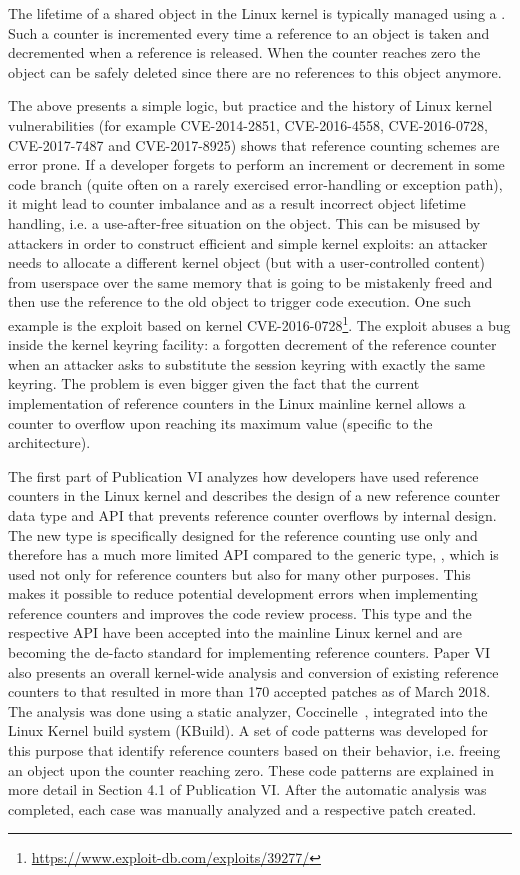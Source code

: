 The lifetime of a shared object in the Linux kernel is typically managed using a . 
Such a counter is incremented every time a reference to an object is taken and decremented when a reference is released. 
When the counter reaches zero the object can be safely deleted since there are no references to this object anymore.

The above presents a simple logic, but practice and the history of Linux kernel vulnerabilities (for example CVE-2014-2851, CVE-2016-4558, CVE-2016-0728, CVE-2017-7487 and CVE-2017-8925) shows that reference counting schemes are error prone. If a developer forgets to perform an increment or decrement in some code branch (quite often on a rarely exercised error-handling or exception path), it might lead to counter imbalance and as a result incorrect object lifetime handling, i.e. a use-after-free situation on the object. This can be misused by attackers in order to construct efficient and simple kernel exploits: an attacker needs to allocate a different kernel object (but with a user-controlled content) from userspace over the same memory that is going to be mistakenly freed and then use the reference to the old object to trigger code execution. One such example is the exploit based on kernel CVE-2016-0728\footnote{\url{https://www.exploit-db.com/exploits/39277/}}. The exploit abuses a bug inside the kernel keyring facility: a forgotten decrement of the reference counter when an attacker asks to substitute the session keyring with exactly the same keyring. 
The problem is even bigger given the fact that the current implementation of reference counters in the Linux mainline kernel allows a counter to overflow upon reaching its maximum value (specific to the architecture). 

The first part of Publication VI analyzes how developers have used reference counters in the Linux kernel and describes the design of a new reference counter data type  and API that prevents reference counter overflows by internal design. 
The new type is specifically designed for the reference counting use only and therefore has a much more limited API compared to the generic type, , which is used not only for reference counters but also for many other purposes. This makes it possible to reduce potential development errors when implementing reference counters and improves the code review process.   
This type and the respective API have been accepted into the mainline Linux kernel and are becoming the de-facto standard for implementing reference counters. 
Paper VI also presents an overall kernel-wide analysis and conversion of existing reference counters to  that resulted in more than 170 accepted patches as of March 2018. The analysis was done using a static analyzer, Coccinelle~\cite{coccinelle}, integrated into the Linux Kernel build system (KBuild). A set of code patterns was developed for this purpose that identify reference counters based on their behavior, i.e. freeing an object upon the counter reaching zero. These code patterns are explained in more detail in Section 4.1 of Publication VI. After the automatic analysis was completed, each case was manually analyzed and a respective patch created. 


